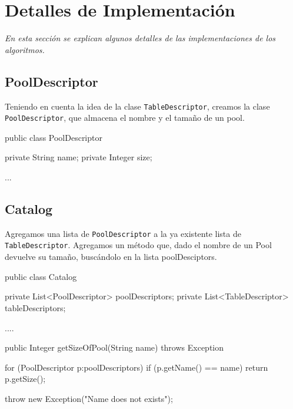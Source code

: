 \section{Detalles de Implementaci\'on}

\textsl{En esta secci\'on se explican algunos detalles de las
implementaciones de los algoritmos.}


\vspace*{0.5cm}

% 
% 


\subsection{PoolDescriptor}

Teniendo en cuenta la idea de la clase \texttt{TableDescriptor},
creamos la clase \texttt{PoolDescriptor}, que almacena el 
nombre y el tamaño de un pool.

\begin{verbatimtab}[4]
public class PoolDescriptor
{
	private String name;
	private Integer size;

	...
}
\end{verbatimtab}



\subsection{Catalog}

Agregamos una lista de \texttt{PoolDescriptor} a la ya existente lista 
de \texttt{TableDescriptor}.
Agregamos un método que, dado el nombre de un Pool devuelve su tamaño, 
buscándolo en la lista poolDesciptors.

\begin{verbatimtab}[4]
public class Catalog
{
	private List<PoolDescriptor> poolDescriptors;
	private List<TableDescriptor> tableDescriptors;	

	....

	public Integer getSizeOfPool(String name) throws Exception 
	{
		for (PoolDescriptor p:poolDescriptors)
		{
			if (p.getName() == name)
			{
				return p.getSize();
			}
		}
		
		throw new Exception("Name does not exists");
	}
}
\end{verbatimtab}

